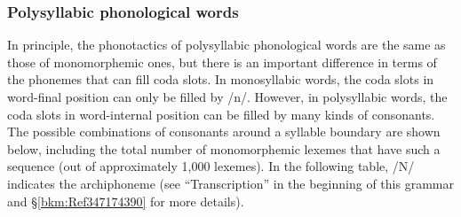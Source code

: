 \subsubsection{Polysyllabic phonological words}
\label{bkm:Ref347179283}\hypertarget{RefHeadingToc395696973}{}\label{bkm:Ref347178311}
In principle, the phonotactics of polysyllabic phonological words are the same as those of monomorphemic ones, but there is an important difference in terms of the phonemes that can fill coda slots. In monosyllabic words, the coda slots in word-final position can only be filled by /n/. However, in polysyllabic words, the coda slots in word-internal position can be filled by many kinds of consonants. The possible combinations of consonants around a syllable boundary are shown below, including the total number of monomorphemic lexemes that have such a sequence (out of approximately 1,000 lexemes). In the following table, /N/ indicates the archiphoneme (see “Transcription” in the beginning of this grammar and §\ref{bkm:Ref347174390} for more details).

